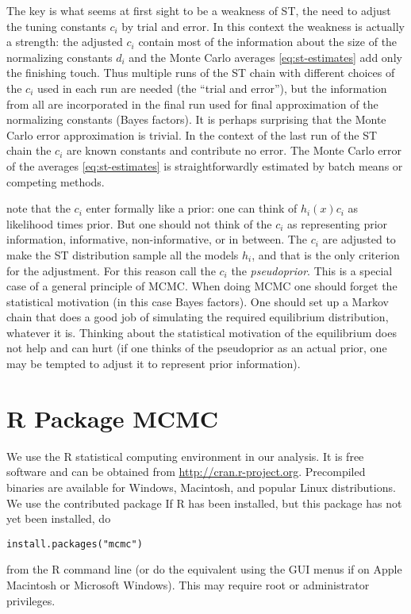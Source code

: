 \documentclass[11pt]{article}
\begin{document}
The key is what seems at first sight to be a weakness of ST, the need to
adjust the tuning constants $c_i$ by trial and error.  In this context the
weakness is actually a strength: the adjusted $c_i$ contain most of the
information about the size of the normalizing constants $d_i$ and the
Monte Carlo averages \eqref{eq:st-estimates} add only the finishing touch.
Thus multiple runs of the ST chain with different choices of the $c_i$ used
in each run are needed (the ``trial and error''), but the information from
all are incorporated in the final run used for final approximation of the
normalizing constants (Bayes factors).  It is perhaps surprising that the
Monte Carlo error approximation is trivial.  In the context of the last run
of the ST chain the $c_i$ are known constants and contribute no error.
The Monte Carlo error of the averages \eqref{eq:st-estimates} is
straightforwardly estimated by batch means or competing methods.

\citet{geyer-thompson} note that the $c_i$ enter formally like a prior:
one can think of $h_i(x) c_i$ as likelihood times prior.  But one should
not think of the $c_i$ as representing prior information, informative,
non-informative, or in between.  The $c_i$ are adjusted to make the ST
distribution sample all the models $h_i$, and that is the only criterion
for the adjustment.  For this reason \citet{geyer-thompson} call the
$c_i$ the \emph{pseudoprior}.  This is a special case of a general principle
of MCMC.  When doing MCMC one should forget the statistical motivation
(in this case Bayes factors).  One should set up a Markov chain that does
a good job of simulating the required equilibrium distribution, whatever
it is.  Thinking about the statistical motivation of the equilibrium does
not help and can hurt (if one thinks of the pseudoprior as an actual prior,
one may be tempted to adjust it to represent prior information).

\section{R Package MCMC}

We use the R statistical computing environment \citep{rcore} in our analysis.
It is free software and can be obtained from
\url{http://cran.r-project.org}.  Precompiled binaries
are available for Windows, Macintosh, and popular Linux distributions.
We use the contributed package \verb@mcmc@ \citep{mcmc-R-package}
If R has been installed, but this package has
not yet been installed, do
\begin{verbatim}
install.packages("mcmc")
\end{verbatim}
from the R command line
(or do the equivalent using the GUI menus if on Apple Macintosh
or Microsoft Windows).  This may require root or administrator privileges.
\end{document}
